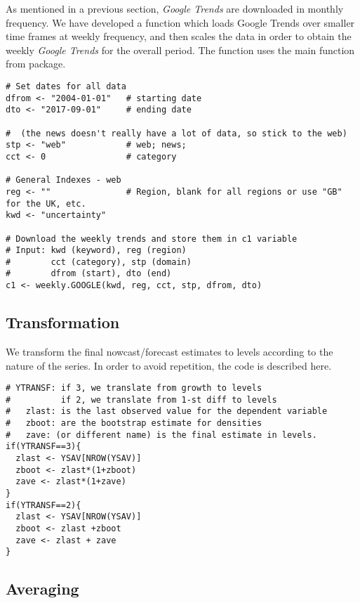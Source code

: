 \documentclass[12pt]{article}
\begin{document}
As mentioned in a previous section, \emph{Google Trends} are downloaded in monthly
frequency. We have developed a function which loads Google Trends over
smaller time frames at weekly frequency, and then scales the data in order
to obtain the weekly \emph{Google Trends} for the overall period. The function uses
the main function from  package.

\begin{lstlisting}[title=\textbf{Weekly Google Trends.}]
# Set dates for all data
dfrom <- "2004-01-01"	# starting date
dto <- "2017-09-01"		# ending date

#  (the news doesn't really have a lot of data, so stick to the web)
stp <- "web"            # web; news;
cct <- 0                # category

# General Indexes - web
reg <- ""               # Region, blank for all regions or use "GB" for the UK, etc.
kwd <- "uncertainty"

# Download the weekly trends and store them in c1 variable
# Input: kwd (keyword), reg (region)
#		 cct (category), stp (domain)
#		 dfrom (start), dto (end)
c1 <- weekly.GOOGLE(kwd, reg, cct, stp, dfrom, dto)
\end{lstlisting}

\subsection{Transformation}

We transform the final nowcast/forecast estimates to
levels according to the nature of the series. In order to avoid repetition,
the code is described here.

\begin{lstlisting}[title=\textbf{From change to levels.}]
# YTRANSF: if 3, we translate from growth to levels
#		   if 2, we translate from 1-st diff to levels
#	zlast: is the last observed value for the dependent variable
#	zboot: are the bootstrap estimate for densities
# 	zave: (or different name) is the final estimate in levels.
if(YTRANSF==3){
  zlast <- YSAV[NROW(YSAV)]
  zboot <- zlast*(1+zboot)
  zave <- zlast*(1+zave)
}
if(YTRANSF==2){
  zlast <- YSAV[NROW(YSAV)]
  zboot <- zlast +zboot
  zave <- zlast + zave
}
\end{lstlisting}

\subsection{Averaging \textendash{} {\href{https://github.com/eurostat/econowcast/blob/master/nowcast/averaging.R}{}}}
\end{document}
